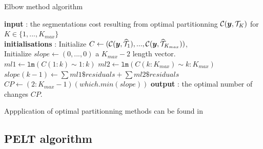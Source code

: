 \begin{algorithm}[ht]
\caption{Elbow method algorithm}\label{chp:3:algoelbow}
\begin{algorithmic}

\State \textbf{input} : the segmentations cost resulting from optimal partitionning ${\mathcal C}(\bm y, {\mathcal T}_{K})$ for $K \in \{1,...,K_{max}\}$ \\

\State \textbf{initialisations} : Initialize $C \gets ({\mathcal C}(\bm y, \widehat{{\mathcal T}}_{1}),...,{\mathcal C}(\bm y, \widehat{{\mathcal T}}_{K_{max}}))$, \\
Initialize $slope \gets (0,...,0)$  a $K_{max}-2$ length vector. 
  \State $ml1 \gets \texttt{lm}(C(1:k) \sim 1:k)$
  \State $ml2 \gets \texttt{lm}(C(k:K_{max}) \sim k:K_{max})$
  \State $slope(k-1) \gets \sum ml1\$ residuals + \sum ml2\$ residuals$
\EndFor
\State $CP \gets (2:K_{max}-1)(which.min(slope))$
\State \textbf{output} : the optimal number of changes $CP$. 
 
\end{algorithmic}
\end{algorithm} 

Appplication of optimal partitionning methods can be found in \cite{rigaill2015pruned,Lavielle1997,perron2006dealing}

\subsection{PELT algorithm}

